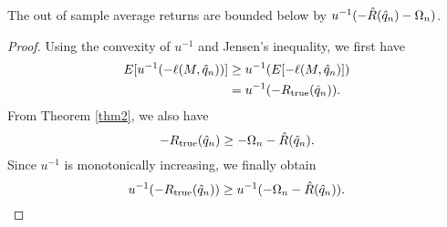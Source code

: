 \begin{claim}
  \label{out_of_sample_claim}
  The out of sample average returns are bounded below by $u^{-1}(-\hat R({\hat q}_n) - \Omega_n)$.
\end{claim}
\begin{proof}
  Using the convexity of $u^{-1}$ and Jensen's inequality, we first have
  \begin{align*}
    E[u^{-1}(-\ell(M,{\hat q}_n))] &\geq u^{-1}(E[-\ell(M,{\hat q}_n)])\\
                                &=u^{-1}(-R_{\mathrm{true}}({\hat q}_n)).
  \end{align*}
  From Theorem \ref{thm2}, we also have 
  \begin{equation*}
    -R_{\mathrm{true}}({\hat q}_n) \geq -\Omega_n - \hat R({\hat q}_n).
  \end{equation*}
  Since $u^{-1}$ is monotonically increasing, we finally obtain
  \begin{equation*}
    u^{-1}(-R_{\mathrm{true}}({\hat q}_n)) \geq u^{-1}(-\Omega_n - \hat R({\hat q}_n)).\qedhere
  \end{equation*}
\end{proof}



